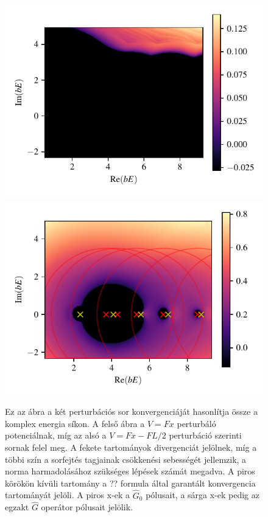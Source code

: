 \begin{figure}[H]
	\centering
	\includegraphics[scale=1]{./figs/convergenceOriginal.pdf}
	\includegraphics[scale=1]{./figs/convergenceImproved.pdf}
	\caption[A Green-függvény perturbációs sorának konvergenciatartománya]{Ez az ábra a két perturbációs sor konvergenciáját hasonlítja össze a komplex energia síkon. A felső ábra a $V=Fx$ perturbáló potenciálnak, míg az alsó a $V = Fx-FL/2$ perturbáció szerinti sornak felel meg. A fekete tartományok divergenciát jelölnek, míg a többi szín a sorfejtés tagjainak csökkenési sebességét jellemzik, a norma harmadolásához szükséges lépések számát megadva. A piros körökön kívüli tartomány a ?? formula által garantált konvergencia tartományát jelöli. A piros x-ek a $\hat{G}_0$ pólusait, a sárga x-ek pedig az egzakt $\hat{G}$ operátor pólusait jelölik.}
\end{figure}